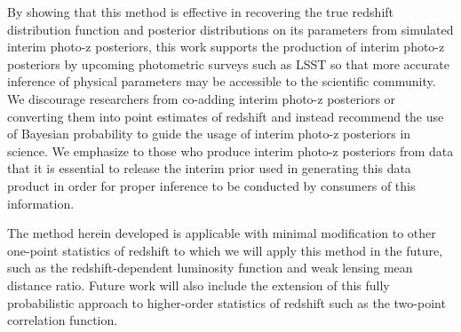 \documentclass[preprint]{aastex}
\begin{document}
By showing that this method is effective in recovering the true redshift 
distribution function and posterior distributions on its parameters from 
simulated interim photo-z posteriors, this work supports the production of 
interim photo-z posteriors by upcoming photometric surveys such as LSST so that 
more accurate inference of physical parameters may be accessible to the 
scientific community.  We discourage researchers from co-adding interim photo-z 
posteriors or converting them into point estimates of redshift and instead 
recommend the use of Bayesian probability to guide the usage of interim photo-z 
posteriors in science.  We emphasize to those who produce interim photo-z 
posteriors from data that it is essential to release the interim prior used in 
generating this data product in order for proper inference to be conducted by 
consumers of this information.

The method herein developed is applicable with minimal modification to other 
one-point statistics of redshift to which we will apply this method in the 
future, such as the redshift-dependent luminosity function and weak lensing 
mean distance ratio.  Future work will also include the extension of this fully 
probabilistic approach to higher-order statistics of redshift such as the 
two-point correlation function.

\clearpage


\end{document}
